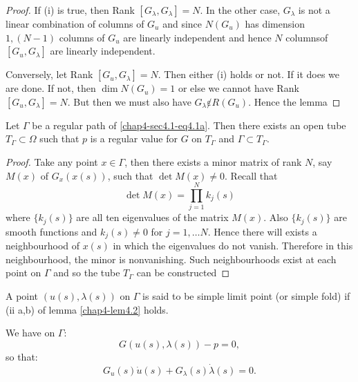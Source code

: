 \begin{proof}
If (i) is true, then Rank $[G_\lambda ,G_\lambda]=N$.  In the other
case, $G_\lambda$ is not a linear combination of columns of $G_u$  and
since $N(G_u)$ has dimension $1,(N-1)$ columns of $G_u$ are linearly
independent and hence $N$ columns\pageoriginale of $[G_u, G_\lambda]$
are linearly independent. 

Conversely, let Rank $[G_u,G_ \lambda ] = N$. Then either (i) holds or
not. If it does we are done. If not, then $\dim N(G_u) = 1$ or else we
cannot have Rank $[G_u,G_ \lambda] = N$. But then we must also have
$G_ \lambda \not\varepsilon R(G_u)$. Hence the lemma 
\end{proof}

\begin{chaplemma}\label{chap4-lem4.3}%
Let $\Gamma$ be a regular path of \eqref{chap4-sec4.1-eq4.1a}. Then
there exists 
  an open tube $T_\Gamma \subset \Omega$ such that $p$ is a regular
  value for $G$ on $T_\Gamma$ and $\Gamma \subset T_\Gamma$. 
\end{chaplemma}

\begin{proof} 
Take any  point $x \in \Gamma$, then there exists a minor
matrix of rank $N$, say $M(x)$ of $G_x(x(s))$, such that $\det M(x)
\neq 0$. Recall that 
$$
\det M(x) = \prod \limits^{N}_{j=1} k_j(s)
$$
where $\{ k_j(s)\}$ are all ten eigenvalues of the matrix $M(x)$. Also
$\{ k_j(s)\}$ are smooth functions and $k_j(s)\neq 0$ for $j=1, \ldots
N$. Hence there will exists a neighbourhood of $x(s)$ in which the
eigenvalues do not vanish. Therefore in this neighbourhood, the minor
is nonvanishing. Such neighbourhoods exist at each point on $\Gamma$
and so the tube $T_\Gamma$ can be constructed 
\end{proof}

\begin{defi*}
A point $(u(s), \lambda (s))$ on $\Gamma$ is said to be simple limit
point (or  simple fold) if (ii a,b) of lemma \ref{chap4-lem4.2} holds. 
 \end{defi*} 
 
 We have on $\Gamma$:
\begin{equation*}
G(u(s), \lambda (s))-p = 0, \tag{4.4a}\label{chap4-eq4.4a}
\end{equation*}\pageoriginale 
so that:
\begin{equation*}
G_u(s)\dot{u}(s) +  G_\lambda (s)\dot{\lambda} (s) =
0. \tag{4.4b}\label{chap4-eq4.4b} 
\end{equation*} 
 
